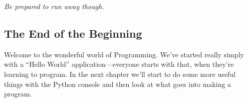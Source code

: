 \noindent
\emph{Be prepared to run away though.}

\subsection*{\color{BrickRed}The End of the Beginning}

Welcome to the wonderful world of Programming.  We've started really simply with a ``Hello World'' application---everyone starts with that, when they're learning to program.
In the next chapter we'll start to do some more useful things with the Python console and then look at what goes into making a program.

\newpage